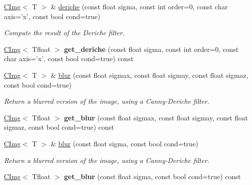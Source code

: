 \begin{DoxyCompactItemize}
\item 
\hyperlink{structcimg__library_1_1CImg}{CImg}$<$ T $>$ \& \hyperlink{structcimg__library_1_1CImg_abe44da28a01b5632c9cb59af2ab6dab6}{deriche} (const float sigma, const int order=0, const char axis='x', const bool cond=true)
\begin{DoxyCompactList}\small\item\em Compute the result of the Deriche filter. \item\end{DoxyCompactList}\item 
\hypertarget{structcimg__library_1_1CImg_a78b160ef01bde55188950e5f9ba7ef57}{
\hyperlink{structcimg__library_1_1CImg}{CImg}$<$ Tfloat $>$ {\bfseries get\_\-deriche} (const float sigma, const int order=0, const char axis='x', const bool cond=true) const }
\label{structcimg__library_1_1CImg_a78b160ef01bde55188950e5f9ba7ef57}

\item 
\hyperlink{structcimg__library_1_1CImg}{CImg}$<$ T $>$ \& \hyperlink{structcimg__library_1_1CImg_afcc7e2db6bcdb9da96698da4ef546678}{blur} (const float sigmax, const float sigmay, const float sigmaz, const bool cond=true)
\begin{DoxyCompactList}\small\item\em Return a blurred version of the image, using a Canny-\/Deriche filter. \item\end{DoxyCompactList}\item 
\hypertarget{structcimg__library_1_1CImg_a0ceb6caab72b2f7bd94697007d4f4aaf}{
\hyperlink{structcimg__library_1_1CImg}{CImg}$<$ Tfloat $>$ {\bfseries get\_\-blur} (const float sigmax, const float sigmay, const float sigmaz, const bool cond=true) const }
\label{structcimg__library_1_1CImg_a0ceb6caab72b2f7bd94697007d4f4aaf}

\item 
\hypertarget{structcimg__library_1_1CImg_a0da5be77c4b3829690661df2561b6c12}{
\hyperlink{structcimg__library_1_1CImg}{CImg}$<$ T $>$ \& \hyperlink{structcimg__library_1_1CImg_a0da5be77c4b3829690661df2561b6c12}{blur} (const float sigma, const bool cond=true)}
\label{structcimg__library_1_1CImg_a0da5be77c4b3829690661df2561b6c12}

\begin{DoxyCompactList}\small\item\em Return a blurred version of the image, using a Canny-\/Deriche filter. \item\end{DoxyCompactList}\item 
\hypertarget{structcimg__library_1_1CImg_a7c8102579c9f84a38ebea0bfc9f44dd9}{
\hyperlink{structcimg__library_1_1CImg}{CImg}$<$ Tfloat $>$ {\bfseries get\_\-blur} (const float sigma, const bool cond=true) const }
\label{structcimg__library_1_1CImg_a7c8102579c9f84a38ebea0bfc9f44dd9}


\end{DoxyCompactItemize}
